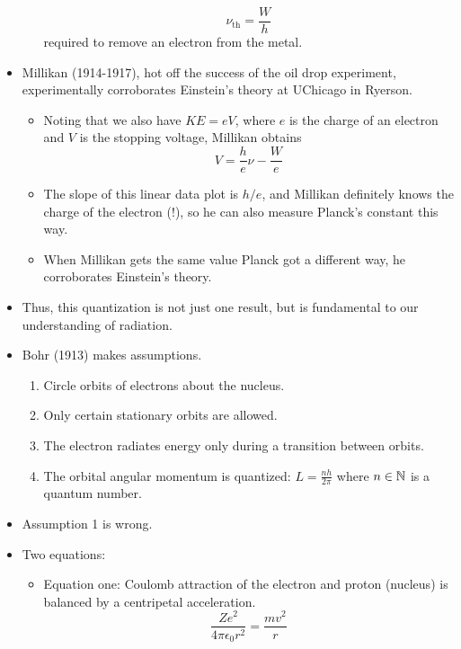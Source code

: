 \documentclass[../notes.tex]{subfiles}
\begin{document}
\begin{itemize}
\begin{itemize}
        \begin{equation*}
            \nu_\text{th} = \frac{W}{h}
        \end{equation*}
        required to remove an electron from the metal.
    \end{itemize}
    \item Millikan (1914-1917), hot off the success of the oil drop experiment, experimentally corroborates Einstein's theory at UChicago in Ryerson.
    \begin{itemize}
        \item Noting that we also have $KE=eV$, where $e$ is the charge of an electron and $V$ is the stopping voltage, Millikan obtains
        \begin{equation*}
            V = \frac{h}{e}\nu-\frac{W}{e}
        \end{equation*}
        \item The slope of this linear data plot is $h/e$, and Millikan definitely knows the charge of the electron (!), so he can also measure Planck's constant this way.
        \item When Millikan gets the same value Planck got a different way, he corroborates Einstein's theory.
    \end{itemize}
    \item Thus, this quantization is not just one result, but is fundamental to our understanding of radiation.
    \item Bohr (1913) makes assumptions.
    \begin{enumerate}
        \item Circle orbits of electrons about the nucleus.
        \item Only certain stationary orbits are allowed.
        \item The electron radiates energy only during a transition between orbits.
        \item The orbital angular momentum is quantized: $L=\frac{nh}{2\pi}$ where $n\in\mathbb{N}$ is a quantum number.
    \end{enumerate}
    \item Assumption 1 is wrong.
    \item Two equations:
    \begin{itemize}
        \item Equation one: Coulomb attraction of the electron and proton (nucleus) is balanced by a centripetal acceleration.
        \begin{equation*}
            \frac{Ze^2}{4\pi\epsilon_0r^2} = \frac{mv^2}{r}

\end{equation*}
\end{itemize}
\end{itemize}
\end{document}
